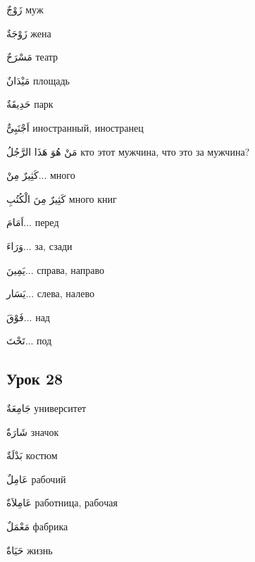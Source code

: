 \documentclass[a5paper]{article}
\newcommand\textstyleDropCaps[1]{#1}
\newcommand\textstyleCaptioncharacters[1]{#1}
\begin{document}
\textstyleCaptioncharacters{زَوْجٌ }\textstyleDropCaps{муж‎}

\textstyleCaptioncharacters{زَوْجَةٌ }\textstyleDropCaps{жена‎}

\textstyleCaptioncharacters{مَسْرَحٌ }\textstyleDropCaps{театр‎}

\textstyleCaptioncharacters{مَيْدَانٌ }\textstyleDropCaps{площадь‎}

\textstyleCaptioncharacters{حَدِيقَةٌ }\textstyleDropCaps{парк‎}

\textstyleCaptioncharacters{اَجْنَبِىٌّ }\textstyleDropCaps{иностранный, ино­странец‎}

\textstyleCaptioncharacters{مَنْ هُوَ هَذَا الرَّجُلُ }\textstyleDropCaps{кто этот мужчина, что это за мужчина?‎}

\textstyleCaptioncharacters{كَثِيرٌ مِنْ...ِ }\textstyleDropCaps{много‎}

\textstyleCaptioncharacters{كَثِيرٌ مِنَ الْكُتُبِ }\textstyleDropCaps{много книг‎}

\textstyleCaptioncharacters{اَمَامَ...ِ }\textstyleDropCaps{перед‎}

\textstyleCaptioncharacters{وَرَاءَ...ِ }\textstyleDropCaps{за, сзади‎}

\textstyleCaptioncharacters{يَمِينَ...ِ }\textstyleDropCaps{справа, направо‎}

\textstyleCaptioncharacters{يَسَار...ِ }\textstyleDropCaps{слева, налево‎}

\textstyleCaptioncharacters{فَوْقَ...ِ }\textstyleDropCaps{над‎}

\textstyleCaptioncharacters{تَحْتَ...ِ }\textstyleDropCaps{под‎}

\subsection[Урок 28‎]{\textstyleDropCaps{Урок 28‎}}
\textstyleCaptioncharacters{جَامِعَةٌ }\textstyleDropCaps{университет‎}

\textstyleCaptioncharacters{شَارَةٌ }\textstyleDropCaps{значок‎}

\textstyleCaptioncharacters{بَدْلَةٌ }\textstyleDropCaps{костюм‎}

\textstyleCaptioncharacters{عَامِلٌ }\textstyleDropCaps{рабочий‎}

\textstyleCaptioncharacters{عَامِلاَةٌ }\textstyleDropCaps{работница, рабо­чая‎}

\textstyleCaptioncharacters{مَعْمَلٌ }\textstyleDropCaps{фабрика‎}

\textstyleCaptioncharacters{حَيَاةٌ }\textstyleDropCaps{жизнь‎}
\end{document}
